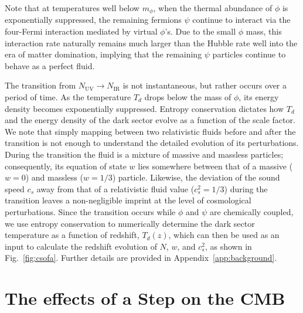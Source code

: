 \documentclass[aps,prd,twocolumn,nofootinbib,superscriptaddress]{revtex4}
\newcommand{\Fig}[1]{Fig.~\ref{fig:#1}}
\newcommand{\App}[1]{Appendix~\ref{app:#1}}
\newcommand{\nir}{N_\text{IR}}
\newcommand{\nuv}{N_\text{UV}}
\begin{document}
Note that at temperatures well below $m_\phi$, when the thermal abundance of $\phi$ is exponentially suppressed, the remaining fermions $\psi$ continue to interact via the four-Fermi interaction mediated by virtual $\phi$'s. Due to the small $\phi$ mass, this interaction rate naturally remains much larger than the Hubble rate well into the era of matter domination, implying that the remaining $\psi$ particles continue to behave as a perfect fluid. 



The transition from $\nuv \to \nir$ is not instantaneous, but rather occurs over a period of time. As the temperature $T_d$ drops below the mass of $\phi$, its energy density becomes exponentially suppressed. Entropy conservation dictates how $T_d$ and the energy density of the dark sector evolve as a function of the scale factor. We note that simply mapping between two relativistic fluids before and after the transition is not enough to understand the detailed evolution of its perturbations. During the transition the fluid is a mixture of massive and massless particles; consequently, its equation of state $w$ lies somewhere between that of a massive ($w=0$) and massless ($w=1/3$) particle. Likewise, the deviation of the sound speed $c_s$ away from that of a relativistic fluid value ($c_s^2 = 1/3$) during the transition leaves a non-negligible imprint at the level of cosmological perturbations. Since the transition occurs while $\phi$ and $\psi$ are chemically coupled, we use entropy conservation to numerically determine the dark sector temperature as a function of redshift, $T_d(z)$, which can then be used as an input to calculate the redshift evolution of $N$, $w$, and $c_s^2$, as shown in  \Fig{csofa}. Further details are provided in \App{background}. 

\section{The effects of a Step on the CMB}
\label{sec:step}
\end{document}
